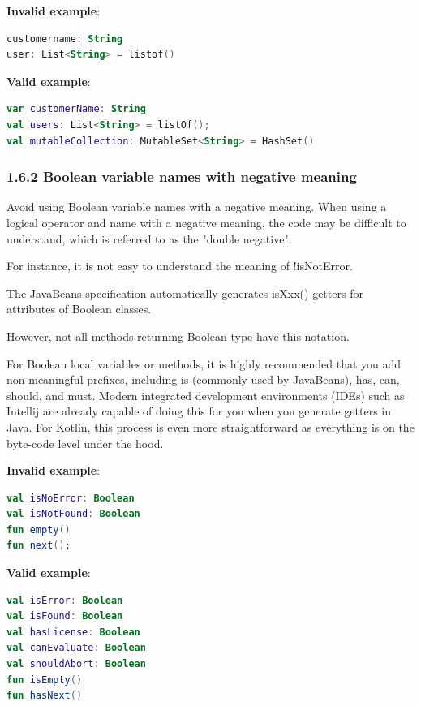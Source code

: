 \textbf{Invalid example}: 

\begin{lstlisting}[language=Kotlin]
customername: String
user: List<String> = listof()
\end{lstlisting}


\textbf{Valid example}: 

\begin{lstlisting}[language=Kotlin]
var customerName: String
val users: List<String> = listOf();
val mutableCollection: MutableSet<String> = HashSet()
\end{lstlisting}


\subsubsection*{\textbf{1.6.2 Boolean variable names with negative meaning}}
\leavevmode\newline

\label{sec:1.6.2}



Avoid using Boolean variable names with a negative meaning. When using a logical operator and name with a negative meaning, the code may be difficult to understand, which is referred to as the "double negative".

For instance, it is not easy to understand the meaning of !isNotError.

The JavaBeans specification automatically generates isXxx() getters for attributes of Boolean classes.

However, not all methods returning Boolean type have this notation.

For Boolean local variables or methods, it is highly recommended that you add non-meaningful prefixes, including is (commonly used by JavaBeans), has, can, should, and must. Modern integrated development environments (IDEs) such as Intellij are already capable of doing this for you when you generate getters in Java. For Kotlin, this process is even more straightforward as everything is on the byte-code level under the hood.



\textbf{Invalid example}: 

\begin{lstlisting}[language=Kotlin]
val isNoError: Boolean
val isNotFound: Boolean
fun empty()
fun next();
\end{lstlisting}


\textbf{Valid example}:

\begin{lstlisting}[language=Kotlin]
val isError: Boolean
val isFound: Boolean
val hasLicense: Boolean
val canEvaluate: Boolean
val shouldAbort: Boolean
fun isEmpty()
fun hasNext()
\end{lstlisting}
